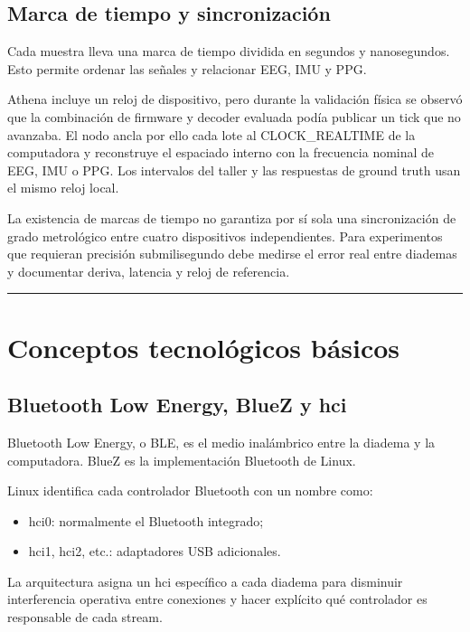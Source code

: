 \documentclass[11pt,a4paper]{article}
\begin{document}
\subsection{Marca de tiempo y sincronización}

Cada muestra lleva una marca de tiempo dividida en segundos y nanosegundos. Esto permite ordenar las señales y relacionar EEG, IMU y PPG.

Athena incluye un reloj de dispositivo, pero durante la validación física se observó que la combinación de firmware y decoder evaluada podía publicar un tick que no avanzaba. El nodo ancla por ello cada lote al {\ttfamily\small CLOCK\_REALTIME} de la computadora y reconstruye el espaciado interno con la frecuencia nominal de EEG, IMU o PPG. Los intervalos del taller y las respuestas de ground truth usan el mismo reloj local.

La existencia de marcas de tiempo no garantiza por sí sola una sincronización de grado metrológico entre cuatro dispositivos independientes. Para experimentos que requieran precisión submilisegundo debe medirse el error real entre diademas y documentar deriva, latencia y reloj de referencia.

\medskip\hrule\medskip

\section{Conceptos tecnológicos básicos}

\subsection{Bluetooth Low Energy, BlueZ y {\ttfamily\small hci}}

Bluetooth Low Energy, o BLE, es el medio inalámbrico entre la diadema y la computadora. BlueZ es la implementación Bluetooth de Linux.

Linux identifica cada controlador Bluetooth con un nombre como:

\begin{itemize}
\item {\ttfamily\small hci0}: normalmente el Bluetooth integrado;
\item {\ttfamily\small hci1}, {\ttfamily\small hci2}, etc.: adaptadores USB adicionales.
\end{itemize}

La arquitectura asigna un {\ttfamily\small hci} específico a cada diadema para disminuir interferencia operativa entre conexiones y hacer explícito qué controlador es responsable de cada stream.
\end{document}
